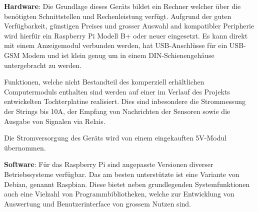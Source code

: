 \textbf{Hardware}:
Die  Grundlage  dieses   Ger\"ats  bildet  ein  Rechner   welcher  \"uber  die
ben\"otigten Schnittstellen  und Rechenleistung verf\"ugt. Aufgrund  der guten
Verf\"ugbarkeit,  g\"unstigen  Preises  und grosser  Auswahl  and  kompatibler
Peripherie wird hierf\"ur ein Raspberry Pi Modell B+ oder neuer eingesetzt. Es
kann  direkt mit  einem  Anzeigemodul verbunden  werden, hat  USB-Anschl\"usse
f\"ur ein USB-GSM Modem und ist  klein genug um in einem DIN-Schienengeh\"ause
untergebracht zu werden.

Funktionen,   welche   nicht   Bestandteil  des   komperziell   erh\"altlichen
Computermoduls  enthalten  sind  werden  auf einer  im  Verlauf  des  Projekts
entwickelten Tochterplatine realisiert. Dies sind inbesondere die Strommessung
der  Strings bis  10A,  der Empfang  von Nachrichten  der  Sensoren sowie  die
Ausgabe von Signalen via Relais.

Die  Stromversorgung  des  Ger\"ats   wird  von  einem  eingekauften  5V-Modul
\"ubernommen.

\textbf{Software}:
F\"ur  das Raspberry  Pi  sind angepasste  Versionen diverser  Betriebssysteme
verf\"ugbar. Das  am  besten  unterst\"utzte  ist eine  Variante  von  Debian,
genannt Raspbian. Diese bietet neben  grundlegenden Systemfunktionen auch eine
Vielzahl von  Programmbibliotheken, welche zur Entwicklung  von Auswertung und
Benutzerinterface von grossem Nutzen sind.
